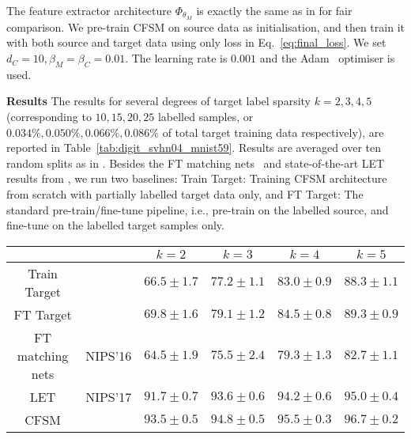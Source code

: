 \documentclass[letterpaper]{article} \usepackage{aaai19}  \usepackage{times}  \usepackage{helvet}  \usepackage{courier}  \usepackage{url}  \usepackage{graphicx}
\newcommand{\keypoint}[1]{\noindent\textbf{#1}\quad}
\newcommand{\cut}[1]{}
\begin{document}
The feature extractor architecture $\Phi_{\theta_M}$ is exactly the same as in \cite{label_eff_open_da_2017} for fair comparison. \cut{The labelled and unlabelled data are subject to no other losses than those in  Eq.~\ref{eq:final_loss}.} We pre-train CFSM on source data as initialisation, and then train it with both source and target data using only loss in Eq.~\ref{eq:final_loss}. We set $d_C=10, \beta_M=\beta_C=0.01$. The learning rate is $0.001$ and the Adam~\cite{kingma2014adam} optimiser is used.

\keypoint{Results}
The results for several degrees of target label sparsity $k = 2,3,4,5$ (corresponding to $10,15,20,25$ labelled samples, or $0.034\%,0.050\%,0.066\%,0.086\%$ of total target training data respectively), are reported in Table~\ref{tab:digit_svhn04_mnist59}. Results are averaged over ten random splits as in \cite{label_eff_open_da_2017}. Besides the FT matching nets~\cite{vinyals2016matching} and state-of-the-art LET results from \cite{label_eff_open_da_2017}, we run two baselines: Train Target: Training CFSM architecture from scratch with partially labelled target data only, and FT Target: The standard pre-train/fine-tune pipeline, i.e., pre-train on the labelled source, and fine-tune on the labelled target samples only.

\begin{table*}[!htb]
\centering
\small
\begin{tabular}{cc|c|c|c|c}
\hline
             & & $k=2$  & $k=3$ & $k=4$ & $k=5$ \\ \hline
Train Target & & $ 66.5 \pm 1.7 $  &  $ 77.2 \pm 1.1 $  &  $ 83.0 \pm 0.9 $  &  $ 88.3 \pm 1.1 $  \\
FT Target    & & $ 69.8 \pm 1.6 $  &  $ 79.1 \pm 1.2 $  &  $ 84.5 \pm 0.8$  &  $ 89.3 \pm 0.9$  \\
FT matching nets & NIPS'16 & $ 64.5 \pm 1.9 $ & $ 75.5 \pm 2.4 $ & $ 79.3 \pm 1.3 $ & $ 82.7 \pm 1.1 $ \\
LET  & NIPS'17 &  $91.7 \pm 0.7$     &  $93.6 \pm 0.6$    &   $94.2 \pm 0.6$    &   $95.0 \pm 0.4$    \\ \hline
CFSM          & &   $ \mathbf{93.5 \pm 0.5} $  &  $ \mathbf{94.8 \pm 0.5} $  &  $ \mathbf{95.5 \pm 0.3} $  &  $ \mathbf{96.7 \pm 0.2} $  \\ \hline
\end{tabular}
\caption{Semi-supervised DLSTL image categorisation results (\%), with mean classification accuracy and standard error for SVHN (0-4) $\to$ MNIST (5-9).}
\label{tab:digit_svhn04_mnist59}
\end{table*}
\end{document}
